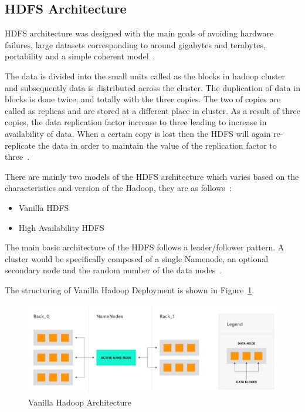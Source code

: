 \subsection{HDFS Architecture}
HDFS architecture was designed with the main goals of avoiding 
hardware failures, large datasets corresponding to around gigabytes 
and terabytes, portability 
and a simple coherent model~\cite{hid-sp18-412-HDFS-Architecture}.

The data is divided into the small units called as the blocks 
in hadoop cluster and subsequently data is distributed 
across the cluster. The duplication of data in blocks 
is done twice, and totally with the three copies. The two of 
copies are called as replicas and are stored at a different 
place in cluster. As a result of three
copies, the data replication factor increase to three 
leading to increase in availability of data. When a certain 
copy is lost then the HDFS will again re-replicate the data in 
order to maintain the value of the 
replication factor to three~\cite{hid-sp18-412-hadoop-architecture-overview}.

There are mainly two models of the HDFS architecture 
which varies based on the characteristics and version 
of the Hadoop, they are 
as follows~\cite{hid-sp18-412-hadoop-architecture-overview}:
\begin{itemize}
\item Vanilla HDFS
\item High Availability HDFS
\end{itemize}

The main basic architecture of the HDFS follows a 
leader/follower pattern. A cluster would be 
specifically composed of a single Namenode, 
an optional secondary node and the 
random number of the data nodes~\cite{hid-sp18-412-HDFS-Architecture}.

The structuring of Vanilla Hadoop Deployment is 
shown in Figure~\ref{s:vaniarchi}.

\begin{figure}[!ht]
\centering\includegraphics[width=\textwidth]{images/vanilla.png}
\caption{Vanilla 
Hadoop 
Architecture
~\cite{hid-sp18-412-hadoop-architecture-overview}}\label{s:vaniarchi}
\end{figure}

